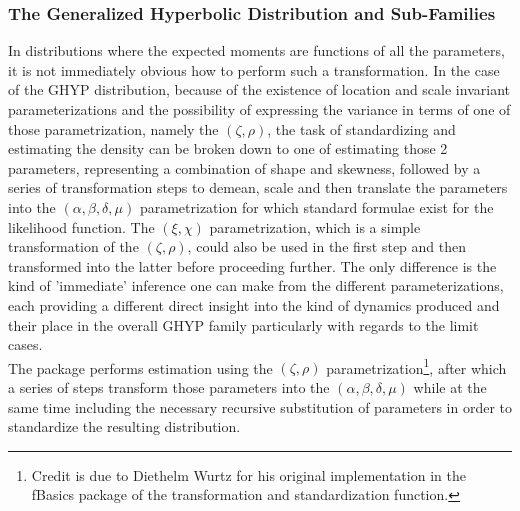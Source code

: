 \subsubsection{The Generalized Hyperbolic Distribution and Sub-Families}\label{ghyp}
In distributions where the expected moments are functions of all the parameters,
it is not immediately obvious how to perform such a transformation. In the case
of the GHYP distribution, because of the existence of location and scale
invariant parameterizations and the possibility of expressing the variance in
terms of one of those parametrization, namely the $(\zeta, \rho)$, the task of
standardizing and estimating the density can be broken down to one of estimating
those 2 parameters, representing a combination of shape and skewness, followed
by a series of transformation steps to demean, scale and then translate the
parameters into the $(\alpha, \beta, \delta, \mu)$ parametrization for which
standard formulae exist for the likelihood function. The $(\xi, \chi)$
parametrization, which is a simple transformation of the $(\zeta, \rho)$,
could also be used in the first step and then transformed into the latter before
proceeding further. The only difference is the kind of 'immediate' inference one
can make from the different parameterizations, each providing a different direct
insight into the kind of dynamics produced and their place in the overall GHYP
family particularly with regards to the limit cases.\\
The \verb@rugarch@ package performs estimation using the $(\zeta, \rho)$
parametrization\footnote{Credit is due to Diethelm Wurtz for his original
implementation in the fBasics package of the transformation and standardization
function.}, after which a series of steps transform those parameters into
the $(\alpha, \beta, \delta, \mu)$ while at the same time including the
necessary recursive substitution of parameters in order to standardize the
resulting distribution.
